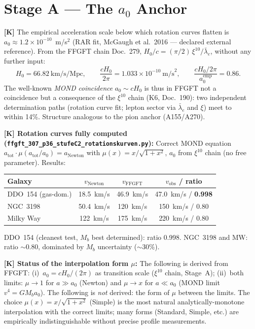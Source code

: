 \documentclass[11pt]{report}
\begin{document}
\section{Stage A — The $a_0$ Anchor}

\textbf{[K]} The empirical acceleration scale below which rotation
curves flatten is $a_0 \approx 1.2\times10^{-10}$~m/s$^2$
(RAR fit, McGaugh et al.\ 2016 — declared external reference).
From the FFGFT chain Doc.~279,
$H_0/c = (\pi/2)\,\xi^{10}/\bar\lambda_e$, without any further input:
\[
  H_0 = 66.82~\text{km/s/Mpc}, \qquad
  \frac{cH_0}{2\pi} = 1.033\times10^{-10}~\text{m/s}^2,
  \qquad \frac{cH_0/2\pi}{a_0^{\text{emp}}} = 0.86.
\]
The well-known \emph{MOND coincidence} $a_0 \sim cH_0$ is thus in FFGFT
not a coincidence but a consequence of the $\xi^{10}$ chain
(K6, Doc.~190): two independent determination paths
(rotation curve fit; lepton sector via $\bar\lambda_e$ and $\xi$)
meet to within 14\%. Structure analogous to the pion anchor (A155/A270).

\medskip
\textbf{[K] Rotation curves fully computed
(\texttt{ffgft\_307\_p36\_stufeC2\_rotationskurven.py}):}
Correct MOND equation $a_\text{tot}\cdot\mu(a_\text{tot}/a_0) =
a_\text{Newton}$ with $\mu(x) = x/\sqrt{1+x^2}$, $a_0$ from
$\xi^{10}$ chain (no free parameter). Results:

\begin{center}
\begin{tabular}{lccc}
\toprule
Galaxy & $v_\text{Newton}$ & $v_\text{FFGFT}$ & $v_\text{obs}$ / ratio \\
\midrule
DDO~154 (gas-dom.)  & 18.5~km/s & 46.9~km/s & 47.0~km/s / \textbf{0.998} \\
NGC~3198            & 50.4~km/s & 120~km/s  & 150~km/s / 0.80 \\
Milky Way           & 122~km/s  & 175~km/s  & 220~km/s / 0.80 \\
\bottomrule
\end{tabular}
\end{center}

DDO~154 (cleanest test, $M_b$ best determined): ratio 0.998.
NGC~3198 and MW: ratio $\sim$0.80, dominated by $M_b$ uncertainty
($\sim$30\%).

\medskip
\textbf{[K] Status of the interpolation form $\mu$:}
The following is derived from FFGFT:
(i)~$a_0 = cH_0/(2\pi)$ as transition scale ($\xi^{10}$ chain, Stage~A);
(ii)~both limits: $\mu \to 1$ for $a \gg a_0$ (Newton) and
$\mu \to x$ for $a \ll a_0$ (MOND limit $v^4 = GM_b a_0$).
The following is \emph{not} derived: the form of $\mu$ between the limits.
The choice $\mu(x) = x/\sqrt{1+x^2}$ (Simple) is the most natural
analytically-monotone interpolation with the correct limits; many forms
(Standard, Simple, etc.) are empirically indistinguishable without
precise profile measurements.
\end{document}
